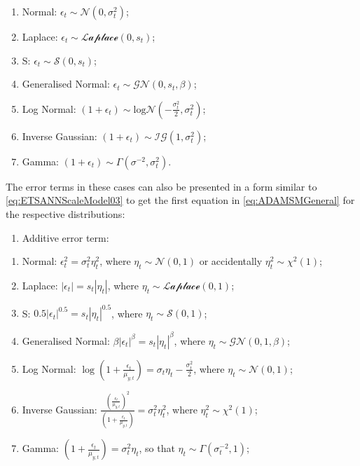 \documentclass[
]{book}
\providecommand{\tightlist}{%
  \setlength{\itemsep}{0pt}\setlength{\parskip}{0pt}}
\theoremstyle{definition}
\theoremstyle{definition}
\theoremstyle{definition}
\theoremstyle{definition}
\theoremstyle{remark}
\begin{document}
\begin{enumerate}
\def\labelenumi{\alph{enumi}.}
\tightlist
\item
  Normal: \(\epsilon_t \sim \mathcal{N}(0, \sigma_t^2)\);
\item
  Laplace: \(\epsilon_t \sim \mathcal{Laplace}(0, s_t)\);
\item
  S: \(\epsilon_t \sim \mathcal{S}(0, s_t)\);
\item
  Generalised Normal: \(\epsilon_t \sim \mathcal{GN}(0, s_t, \beta)\);
\item
  Log Normal: \(\left(1+\epsilon_t \right) \sim \mathrm{log}\mathcal{N}\left(-\frac{\sigma_t^2}{2}, \sigma_t^2\right)\);
\item
  Inverse Gaussian: \(\left(1+\epsilon_t \right) \sim \mathcal{IG}(1, \sigma_t^2)\);
\item
  Gamma: \(\left(1+\epsilon_t \right) \sim \Gamma (\sigma^{-2}, \sigma_t^2)\).
\end{enumerate}

The error terms in these cases can also be presented in a form similar to \eqref{eq:ETSANNScaleModel03} to get the first equation in \eqref{eq:ADAMSMGeneral} for the respective distributions:

\begin{enumerate}
\def\labelenumi{\arabic{enumi}.}
\tightlist
\item
  Additive error term:
\end{enumerate}

\begin{enumerate}
\def\labelenumi{\alph{enumi}.}
\tightlist
\item
  Normal: \(\epsilon_t^2 = \sigma_t^2 \eta_t^2\), where \(\eta_t \sim \mathcal{N}(0, 1)\) or accidentally \(\eta_t^2 \sim \chi^2(1)\);
\item
  Laplace: \(|\epsilon_t| = s_t |\eta_t|\), where \(\eta_t \sim \mathcal{Laplace}(0, 1)\);
\item
  S: \(0.5 |\epsilon_t|^{0.5} = s_t |\eta_t|^{0.5}\), where \(\eta_t \sim \mathcal{S}(0, 1)\);
\item
  Generalised Normal: \(\beta |\epsilon_t|^{\beta} = s_t |\eta_t|^{\beta}\), where \(\eta_t \sim \mathcal{GN}(0, 1, \beta)\);
\item
  Log Normal: \(\log\left(1+\frac{\epsilon_t}{\mu_{y,t}} \right) = \sigma_t \eta_t-\frac{\sigma_t^2}{2}\), where \(\eta_t \sim \mathcal{N}(0, 1)\);
\item
  Inverse Gaussian: \(\frac{\left(\frac{\epsilon_t}{\mu_{y,t}} \right)^2}{\left(1+\frac{\epsilon_t}{\mu_{y,t}} \right)}=\sigma^2_t \eta_t^2\), where \(\eta_t^2 \sim \chi^2(1)\);
\item
  Gamma: \(\left(1+\frac{\epsilon_t}{\mu_{y,t}} \right) = \sigma_t^2 \eta_t\), so that \(\eta_t \sim \mathcal{\Gamma}(\sigma_t^{-2}, 1)\);
\end{enumerate}
\end{document}
